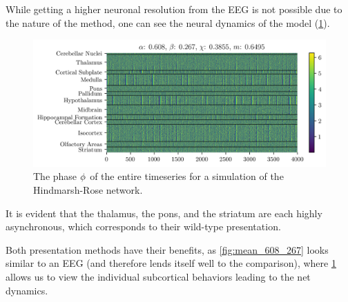 While getting a higher neuronal resolution from the EEG is not possible due to the nature of the method,
one can see the neural dynamics of the model (\cref{fig:overhead_608_267}).
\begin{figure}[ht]
  \centering
  \includegraphics[width=\textwidth]{figure/overhead-0_608-0_267}
  \caption[Hindmarsh-Rose time series]{The phase $\phi$ of the entire timeseries for a simulation of the Hindmarsh-Rose network.}
  \label{fig:overhead_608_267}
\end{figure}
It is evident that the thalamus, the pons, and the striatum are each highly asynchronous, which corresponds to their wild-type presentation.

Both presentation methods have their benefits, as \cref{fig:mean_608_267} looks similar to an EEG (and therefore lends itself well to the comparison), where \cref{fig:overhead_608_267} allows us to view the individual subcortical behaviors leading to the net dynamics.

